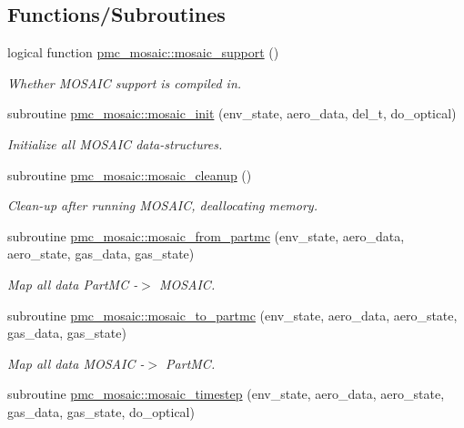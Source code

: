 \subsection*{Functions/\+Subroutines}
\begin{DoxyCompactItemize}
\item 
logical function \mbox{\hyperlink{namespacepmc__mosaic_a22592fd57cef945bbb2ef2e49bc0f05c}{pmc\+\_\+mosaic\+::mosaic\+\_\+support}} ()
\begin{DoxyCompactList}\small\item\em Whether M\+O\+S\+A\+IC support is compiled in. \end{DoxyCompactList}\item 
subroutine \mbox{\hyperlink{namespacepmc__mosaic_a1cdd76ef5164c35b7fe46b4fe3c2b044}{pmc\+\_\+mosaic\+::mosaic\+\_\+init}} (env\+\_\+state, aero\+\_\+data, del\+\_\+t, do\+\_\+optical)
\begin{DoxyCompactList}\small\item\em Initialize all M\+O\+S\+A\+IC data-\/structures. \end{DoxyCompactList}\item 
subroutine \mbox{\hyperlink{namespacepmc__mosaic_a0165a7096d2674446d32c4ad0193eca0}{pmc\+\_\+mosaic\+::mosaic\+\_\+cleanup}} ()
\begin{DoxyCompactList}\small\item\em Clean-\/up after running M\+O\+S\+A\+IC, deallocating memory. \end{DoxyCompactList}\item 
subroutine \mbox{\hyperlink{namespacepmc__mosaic_a2f4a894b5b6a349f83df026675a64940}{pmc\+\_\+mosaic\+::mosaic\+\_\+from\+\_\+partmc}} (env\+\_\+state, aero\+\_\+data, aero\+\_\+state, gas\+\_\+data, gas\+\_\+state)
\begin{DoxyCompactList}\small\item\em Map all data Part\+MC -\/$>$ M\+O\+S\+A\+IC. \end{DoxyCompactList}\item 
subroutine \mbox{\hyperlink{namespacepmc__mosaic_aa1b93b04307f0290a3ccf15d4453c473}{pmc\+\_\+mosaic\+::mosaic\+\_\+to\+\_\+partmc}} (env\+\_\+state, aero\+\_\+data, aero\+\_\+state, gas\+\_\+data, gas\+\_\+state)
\begin{DoxyCompactList}\small\item\em Map all data M\+O\+S\+A\+IC -\/$>$ Part\+MC. \end{DoxyCompactList}\item 
subroutine \mbox{\hyperlink{namespacepmc__mosaic_a6a1b2f55bf5d07b18be883ad7163d44d}{pmc\+\_\+mosaic\+::mosaic\+\_\+timestep}} (env\+\_\+state, aero\+\_\+data, aero\+\_\+state, gas\+\_\+data, gas\+\_\+state, do\+\_\+optical)

\end{DoxyCompactItemize}
